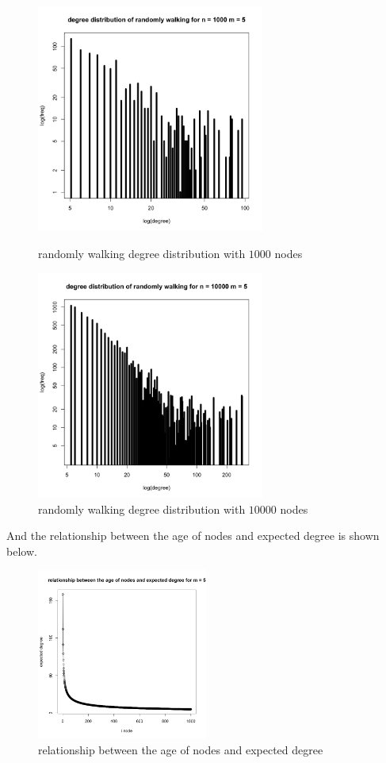 \documentclass[draftcls,12pt,onecolumn]{IEEEtran}
\begin{document}
\begin{figure}[htbp]
\centering
\begin{minipage}[t]{0.48\textwidth}
\centering
\includegraphics[width=7.5cm]{img/2_g_2_degree3}
\caption{randomly walking degree distribution with $1000$ nodes}
\end{minipage}
\begin{minipage}[t]{0.48\textwidth}
\centering
\includegraphics[width=7.5cm]{img/2_g_2_degree4}
\caption{randomly walking degree distribution with $10000$ nodes}
\end{minipage}
\end{figure}

And the relationship between the age of nodes and expected degree is shown below.
\begin{figure}[H]
\centering
\includegraphics[width=0.5\textwidth]{img/2_g_2_relat}
\caption{relationship between the age of nodes and expected degree}
\end{figure}
\end{document}
